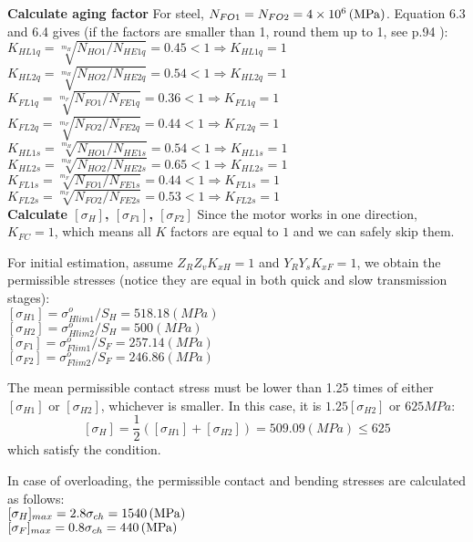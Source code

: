 \textbf{Calculate aging factor} 
For steel, $ N_{FO1}= N_{FO2}= 4\times10^6\, (\mathrm{MPa})$. Equation 6.3 and 6.4 \cite{tk1}  gives (if the factors are smaller than 1, round them up to 1, see p.94 \cite{tk1}):\\
$ K_{HL1q} = \sqrt[m_H]{N_{HO1}/N_{HE1q}} = 0.45 < 1 \Rightarrow K_{HL1q} = 1$\\
$ K_{HL2q} = \sqrt[m_H]{N_{HO2}/N_{HE2q}} = 0.54 < 1 \Rightarrow K_{HL2q} = 1$\\
$ K_{FL1q} = \sqrt[m_F]{N_{FO1}/N_{FE1q}} = 0.36 < 1 \Rightarrow K_{FL1q} = 1$\\
$ K_{FL2q} = \sqrt[m_F]{N_{FO2}/N_{FE2q}} = 0.44 < 1 \Rightarrow K_{FL2q} = 1$\\
$ K_{HL1s} = \sqrt[m_H]{N_{HO1}/N_{HE1s}} = 0.54 < 1 \Rightarrow K_{HL1s} = 1$\\
$ K_{HL2s} = \sqrt[m_H]{N_{HO2}/N_{HE2s}} = 0.65 < 1 \Rightarrow K_{HL2s} = 1$\\
$ K_{FL1s} = \sqrt[m_F]{N_{FO1}/N_{FE1s}} = 0.44 < 1 \Rightarrow K_{FL1s} = 1$\\
$ K_{FL2s} = \sqrt[m_F]{N_{FO2}/N_{FE2s}} = 0.53 < 1 \Rightarrow K_{FL2s} = 1$\\

\textbf{Calculate $ [{\sigma}_H] $, $ [{\sigma}_{F1}] $, $ [{\sigma}_{F2}] $}
Since the motor works in one direction, $ K_{FC} = 1$, which means all $ K $ factors are equal to $ 1 $ and we can safely skip them.

For initial estimation, assume $ Z_RZ_vK_{xH} = 1 $ and $ Y_RY_sK_{xF} = 1 $, we obtain the permissible stresses (notice they are equal in both quick and slow transmission stages):\\
$ [{\sigma}_{H1}] = \sigma_{Hlim1}^o/S_{H} = 518.18 \unit{(MPa)}$\\
$ [{\sigma}_{H2}] = \sigma_{Hlim2}^o/S_{H} = 500 \unit{(MPa)}$\\
$ [{\sigma}_{F1}] = \sigma_{Flim1}^o/S_{F} = 257.14\unit{(MPa)}$\\
$ [{\sigma}_{F2}] = \sigma_{Flim2}^o/S_{F} = 246.86 \unit{(MPa)}$

The mean permissible contact stress must be lower than 1.25 times of either $ [{\sigma}_{H1}] $ or $ [{\sigma}_{H2}] $, whichever is smaller. In this case, it is $ 1.25[{\sigma}_{H2}]$ or $ 625\unit{MPa} $:
\[[{\sigma}_{H}] =\dfrac{1}{2}\left( [{\sigma}_{H1}]+[{\sigma}_{H2}]\right)  = 509.09 \unit{(MPa)}\leq 625\]
which satisfy the condition.

In case of overloading, the permissible contact and bending stresses are calculated as follows:\\
$ [{\sigma}_H]_{max} = 2.8\sigma_{ch} = 1540\, (\mathrm{MPa}) $\\
$ [{\sigma}_F]_{max} = 0.8\sigma_{ch} = 440\, (\mathrm{MPa}) $

